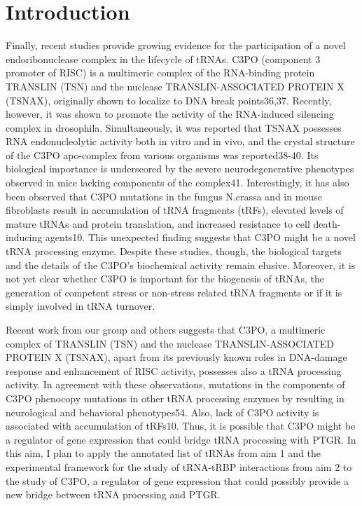 \documentclass[12pt]{rockefeller}
\begin{document}
\section{Introduction}
Finally, recent studies provide growing evidence for the participation of a novel endoribonuclease complex in the lifecycle of tRNAs. C3PO (component 3 promoter of RISC) is a multimeric complex of the RNA-binding protein TRANSLIN (TSN) and the nuclease TRANSLIN-ASSOCIATED PROTEIN X (TSNAX), originally shown to localize to DNA break points36,37. Recently, however, it was shown to promote the activity of the RNA-induced silencing complex in drosophila. Simultaneously, it was reported that TSNAX possesses RNA endonucleolytic activity both in vitro and in vivo, and the crystal structure of the C3PO apo-complex from various organisms was reported38-40. Its biological importance is underscored by the severe neurodegenerative phenotypes observed in mice lacking components of the complex41. Interestingly, it has also been observed that C3PO mutations in the fungus N.crassa and in mouse fibroblasts result in accumulation of tRNA fragments (tRFs), elevated levels of mature tRNAs and protein translation, and increased resistance to cell death-inducing agents10. This unexpected finding suggests that C3PO might be a novel tRNA processing enzyme. Despite these studies, though, the biological targets and the details of the C3PO’s biochemical activity remain elusive. Moreover, it is not yet clear whether C3PO is important for the biogenesis of tRNAs, the generation of competent stress or non-stress related tRNA fragments or if it is simply involved in tRNA turnover. 

Recent work from our group and others suggests that C3PO, a multimeric complex of TRANSLIN (TSN) and the nuclease TRANSLIN-ASSOCIATED PROTEIN X (TSNAX), apart from its previously known roles in DNA-damage response and enhancement of RISC activity, possesses also a tRNA processing activity. In agreement with these observations, mutations in the components of C3PO phenocopy mutations in other tRNA processing enzymes by resulting in neurological and behavioral phenotypes54. Also, lack of C3PO activity is associated with accumulation of tRFs10. Thus, it is possible that C3PO might be a regulator of gene expression that could bridge tRNA processing with PTGR. In this aim, I plan to apply the annotated list of tRNAs from aim 1 and the experimental framework for the study of tRNA-tRBP interactions from aim 2 to the study of C3PO, a regulator of gene expression that could possibly provide a new bridge between tRNA processing and PTGR. 
\end{document}
